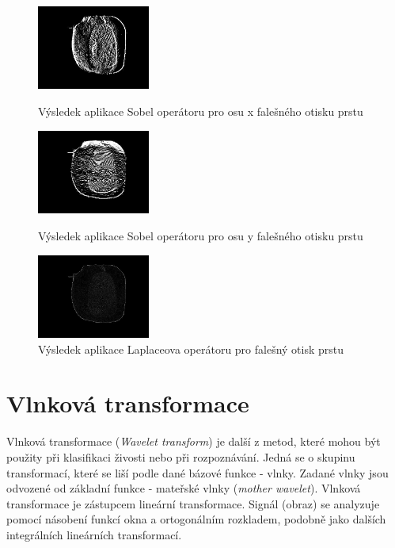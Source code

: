 \begin{figure}[!htbp]
  \begin{minipage}[b]{0.3\linewidth}
    \centering
    \includegraphics[width=140px]{obrazky-figures/sobelxfingerprint.png}
    \caption{Výsledek aplikace Sobel operátoru pro osu x falešného otisku prstu}
  \end{minipage}
  \hspace{0.3cm}
  \begin{minipage}[b]{0.3\linewidth}
    \centering
    \includegraphics[width=140px]{obrazky-figures/sobelyfingerprint.png}
    \caption{Výsledek aplikace Sobel operátoru pro osu y falešného otisku prstu}
  \end{minipage}
  \hspace{0.3cm}
    \begin{minipage}[b]{0.3\linewidth}
    \centering
    \includegraphics[width=140px]{obrazky-figures/laplacianfingerprint.png}
    \caption{Výsledek aplikace Laplaceova operátoru pro falešný otisk prstu}
  \end{minipage}
\end{figure}

\section{Vlnková transformace}
Vlnková transformace (\textit{Wavelet transform}) je další z metod, které mohou být použity při klasifikaci živosti nebo při rozpoznávání. Jedná se o skupinu transformací, které se liší podle dané bázové funkce - vlnky. Zadané vlnky jsou odvozené od základní funkce - mateřské vlnky (\textit{mother wavelet}). Vlnková transformace je zástupcem lineární transformace. Signál (obraz) se analyzuje pomocí násobení funkcí okna a ortogonálním rozkladem, podobně jako dalších integrálních lineárních transformací. 

